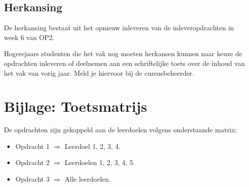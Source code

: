 \documentclass{cursushandleiding}
\begin{document}
\subsection{Herkansing}
%
De herkansing bestaat uit het opnieuw inleveren van de inleveropdrachten in week 6 van OP2.

Hogerejaars studenten die het vak nog moeten herkansen kunnen naar keuze de opdrachten inleveren of deelnemen aan een schriftelijke toets over de inhoud van het vak van vorig jaar. Meld je hiervoor bij de cursusbeheerder.
%
\section*{Bijlage: Toetsmatrijs}
%
De opdrachten zijn gekoppeld aan de leerdoelen volgens onderstaande matrix:
%
\begin{itemize}
\item Opdracht 1 $\Rightarrow$ Leerdoel 1, 2, 3, 4.
\item Opdracht 2 $\Rightarrow$ Leerdoelen 1, 2, 3, 4, 5.
\item Opdracht 3 $\Rightarrow$ Alle leerdoelen.
\end{itemize}
%
\end{document}
